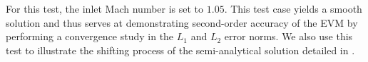 \documentclass[times,doublespace]{fldauth}%
\begin{document}
For this test, the inlet Mach number is set to $1.05$.
This test case yields a smooth solution and thus serves at demonstrating second-order accuracy of the EVM by performing a convergence study in the $L_1$ and $L_2$ error norms. We also use this test to illustrate the shifting process of the semi-analytical solution detailed in .
\end{document}
